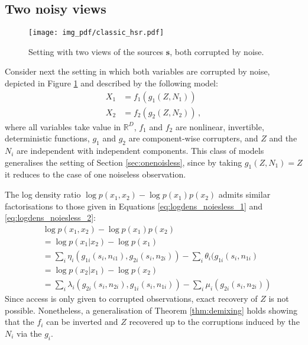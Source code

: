 \subsection{Two noisy views}
\label{sec:constrained}

\begin{figure}[t!]
	\centering
	\texttt{[image: img\_pdf/classic\_hsr.pdf]}
	\caption{Setting with two views of the sources $\bm{s}$, both corrupted by noise.}
	\label{fig:classic_hsr}
\end{figure}

Consider next the setting in which both variables are corrupted by noise, depicted in Figure \ref{fig:classic_hsr} and described by the following model:
\begin{align*}
X_{1}&={f}_{1}({g}_{1}({Z},N_{1}))  \\
X_{2}&={f}_{2}({g}_{2}({Z},N_{2}))  \,,
\end{align*}
where all variables take value in $\mathbb{R}^D$, ${f}_{1}$ and ${f}_{2}$ are nonlinear, invertible, deterministic functions,
${g}_{1}$ and ${g}_{2}$ are component-wise corrupters, and $Z$ and the $N_i$ are independent with independent components.
This class of models generalises the setting of Section \ref{sec:onenoisless}, since by taking ${g}_1(Z, N_1) = Z$ it reduces to the case of one noiseless observation.

The log density ratio $\log p({x}_1, {x}_2) - \log p({x}_1)p({x}_2)$ admits similar factorisations to those given in Equations \ref{eq:logdens_noiesless_1} and \ref{eq:logdens_noiesless_2}:
\begin{align}
&\log p({x}_1, {x}_2) - \log p({x}_1) p({x}_2) \nonumber\\
&= \log p({x}_1 | {x}_2) - \log p({x}_1)\nonumber\\
&= \sum_i \eta_i(g_{1i}(s_i, n_{i1}), g_{2i}(s_i, n_{2i})) - \sum_i \theta_i(g_{1i}(s_i, n_{1i}) \label{eq:noisylogdens_1}\\
&= \log p({x}_2 | {x}_1) - \log p({x}_2) \nonumber\\
&= \sum_i \lambda_i(g_{2i}(s_i, n_{2i}), g_{1i}(s_i, n_{1i})) - \sum_i \mu_i(g_{2i}(s_i, n_{2i})) \label{eq:noisylogdens_2}
\end{align}
Since access is only given to corrupted observations, exact recovery of $Z$ is not possible.
Nonetheless, a generalisation of Theorem \ref{thm:demixing} holds showing that the ${f}_i$ can be inverted and $Z$ recovered up to the corruptions induced by the $N_i$ via the ${g}_i$.

